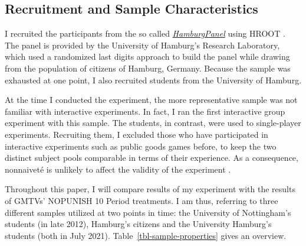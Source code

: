 \documentclass[
  authoryear,
  review,
  3p,
  onecolumn]{elsarticle}
\begin{document}
\hypertarget{sec-sample}{%
\subsection{Recruitment and Sample Characteristics}\label{sec-sample}}

I recruited the participants from the so called
\emph{\href{https://www.wiso.uni-hamburg.de/forschung/forschungslabor/umfragelabor/aktuelle-umfragen/hamburgpanel.html}{HamburgPanel}}
using HROOT \citep{hroot}. The panel is provided by the University of
Hamburg's Research Laboratory, which used a randomized last digits
approach to build the panel while drawing from the population of
citizens of Hamburg, Germany. Because the sample was exhausted at one
point, I also recruited students from the University of Hamburg.

At the time I conducted the experiment, the more representative sample
was not familiar with interactive experiments. In fact, I ran the first
interactive group experiment with this sample. The students, in
contrast, were used to single-player experiments. Recruiting them, I
excluded those who have participated in interactive experiments such as
public goods games before, to keep the two distinct subject pools
comparable in terms of their experience. As a consequence, nonnaiveté is
unlikely to affect the validity of the experiment \citep[
p.~204]{GoodmanPaolacci2017}.

Throughout this paper, I will compare results of my experiment with the
results of GMTVs' NOPUNISH 10 Period treatments. I am thus, referring to
three different samples utilized at two points in time: the University
of Nottingham's students (in late 2012), Hamburg's citizens and the
University Hamburg's students (both in July 2021).
Table~\ref{tbl-sample-properties} gives an overview.

\hypertarget{tbl-sample-properties}{}
\begin{table}[!htbp] \centering \renewcommand*{\arraystretch}{1.1}\caption{\label{tbl-sample-properties}Sample Properties }
\end{table}
\end{document}
